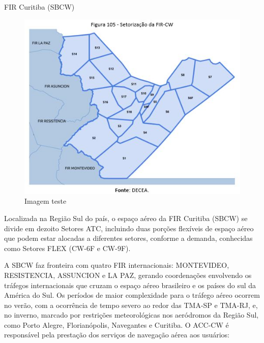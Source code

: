 \documentclass[
]{book}
\begin{document}
FIR Curitiba (SBCW)

\begin{figure}
\centering
\includegraphics{imagens/fig97.jpg}
\caption{Imagem teste}
\end{figure}

Localizada na Região Sul do país, o espaço aéreo da FIR Curitiba (SBCW) se divide em dezoito Setores ATC, incluindo duas porções flexíveis de espaço aéreo que podem estar alocadas a diferentes setores, conforme a demanda, conhecidas como Setores FLEX (CW-6F e CW-9F).

A SBCW faz fronteira com quatro FIR internacionais: MONTEVIDEO, RESISTENCIA, ASSUNCION e LA PAZ, gerando coordenações envolvendo os tráfegos internacionais que cruzam o espaço aéreo brasileiro e os países do sul da América do Sul. Os períodos de maior complexidade para o tráfego aéreo ocorrem no verão, com a ocorrência de tempo severo ao redor das TMA-SP e TMA-RJ, e, no inverno, marcado por restrições meteorológicas nos aeródromos da Região Sul, como Porto Alegre, Florianópolis, Navegantes e Curitiba. O ACC-CW é responsável pela prestação dos serviços de navegação aérea aos usuários:
\end{document}
